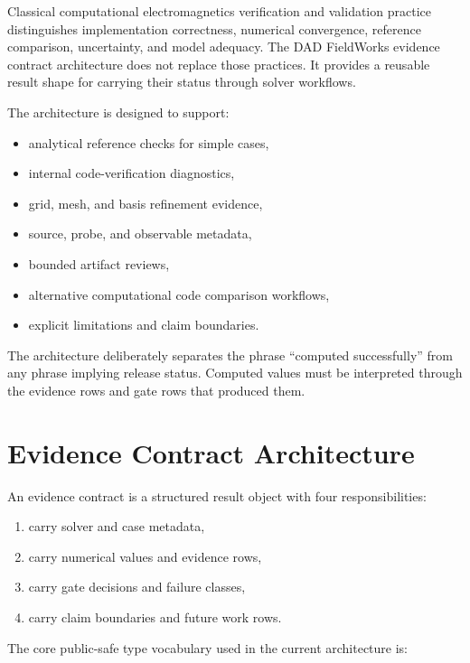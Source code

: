 \documentclass[11pt,a4paper]{article}
\begin{document}
Classical computational electromagnetics verification and validation practice distinguishes implementation correctness, numerical convergence, reference comparison, uncertainty, and model adequacy. The DAD FieldWorks evidence contract architecture does not replace those practices. It provides a reusable result shape for carrying their status through solver workflows.

The architecture is designed to support:

\begin{itemize}
  \item analytical reference checks for simple cases,
  \item internal code-verification diagnostics,
  \item grid, mesh, and basis refinement evidence,
  \item source, probe, and observable metadata,
  \item bounded artifact reviews,
  \item alternative computational code comparison workflows,
  \item explicit limitations and claim boundaries.
\end{itemize}

The architecture deliberately separates the phrase ``computed successfully'' from any phrase implying release status. Computed values must be interpreted through the evidence rows and gate rows that produced them.

\section{Evidence Contract Architecture}
\label{sec:evidence-contract-architecture}

An evidence contract is a structured result object with four responsibilities:

\begin{enumerate}
  \item carry solver and case metadata,
  \item carry numerical values and evidence rows,
  \item carry gate decisions and failure classes,
  \item carry claim boundaries and future work rows.
\end{enumerate}

The core public-safe type vocabulary used in the current architecture is:
\end{document}
